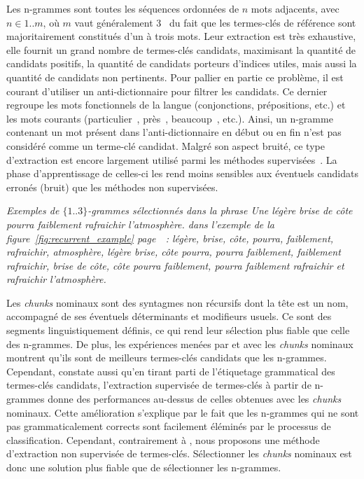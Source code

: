     Les n-grammes sont toutes les séquences ordonnées de $n$ mots adjacents,
    avec $n \in 1..m$, où $m$ vaut généralement
    3~\cite{witten1999kea,turney1999learningalgorithms,hulth2003keywordextraction}
    du fait que les termes-clés de référence sont majoritairement constitués
    d'un à trois mots. Leur extraction est très exhaustive, elle fournit un
    grand nombre de termes-clés candidats, maximisant la quantité de candidats
    positifs, la quantité de candidats porteurs d'indices utiles, mais aussi la
    quantité de candidats non pertinents. Pour pallier en partie ce problème, il
    est courant d'utiliser un anti-dictionnaire pour filtrer les candidats. Ce
    dernier regroupe les mots fonctionnels de la langue (conjonctions,
    prépositions, etc.) et les mots courants (\og particulier~\fg, \og près~\fg,
    \og beaucoup~\fg, etc.). Ainsi, un n-gramme contenant un mot présent dans
    l'anti-dictionnaire en début ou en fin n'est pas considéré comme un
    terme-clé candidat. Malgré son aspect bruité, ce type d'extraction est
    encore largement utilisé parmi les méthodes
    supervisées~\cite{witten1999kea,turney1999learningalgorithms,hulth2003keywordextraction}.
    La phase d'apprentissage de celles-ci les rend moins sensibles aux éventuels
    candidats erronés (bruit) que les méthodes non supervisées.

    \textit{Exemples de $\{1..3\}$-grammes sélectionnés dans la phrase \og{}Une
    légère brise de côte pourra faiblement rafraichir l'atmosphère.\fg{} dans
    l'exemple de la figure~\ref{fig:recurrent_example}
    page~\pageref{fig:recurrent_example}~: \og{}légère\fg{}, \og{}brise\fg{},
    \og{}côte\fg{}, \og{}pourra\fg{}, \og{}faiblement\fg{},
    \og{}rafraichir\fg{}, \og{}atmosphère\fg{}, \og{}légère brise\fg{},
    \og{}côte pourra\fg{}, \og{}pourra faiblement\fg{}, \og{}faiblement
    rafraichir\fg{}, \og{}brise de côte\fg{}, \og{}côte pourra faiblement\fg{},
    \og{}pourra faiblement rafraichir\fg{} et \og{}rafraichir
    l'atmosphère\fg{}.}

    Les \textit{chunks} nominaux sont des syntagmes non récursifs dont la tête est un
    nom, accompagné de ses éventuels déterminants et modifieurs usuels. Ce sont
    des segments linguistiquement définis, ce qui rend leur sélection plus
    fiable que celle des n-grammes. De plus, les expériences menées par
     et  avec les
    \textit{chunks} nominaux montrent qu'ils sont de meilleurs termes-clés candidats que
    les n-grammes. Cependant,  constate
    aussi qu'en tirant parti de l'étiquetage grammatical des termes-clés
    candidats, l'extraction supervisée de termes-clés à partir de n-grammes
    donne des performances au-dessus de celles obtenues avec les \textit{chunks}
    nominaux. Cette amélioration s'explique par le fait que les n-grammes qui ne
    sont pas grammaticalement corrects sont facilement éléminés par le processus
    de classification. Cependant, contrairement à
    , nous proposons une méthode
    d'extraction non supervisée de termes-clés. Sélectionner les \textit{chunks} nominaux
    est donc une solution plus fiable que de sélectionner les n-grammes.

